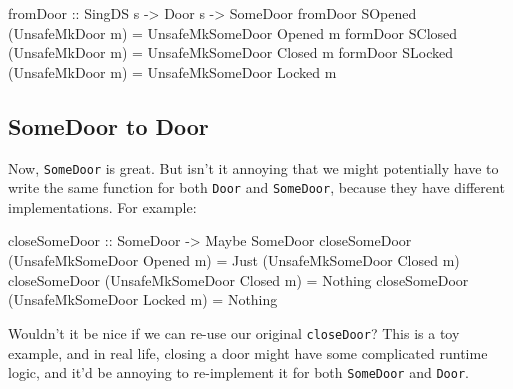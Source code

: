 \documentclass[]{article}
\newenvironment{Shaded}{}{}
\newcommand{\DataTypeTok}[1]{\textcolor[rgb]{0.56,0.13,0.00}{#1}}
\newcommand{\OtherTok}[1]{\textcolor[rgb]{0.00,0.44,0.13}{#1}}
\newcommand{\FunctionTok}[1]{\textcolor[rgb]{0.02,0.16,0.49}{#1}}
\newcommand{\NormalTok}[1]{#1}
\begin{document}
\begin{Shaded}
\begin{Highlighting}[]
\OtherTok{fromDoor ::} \DataTypeTok{SingDS}\NormalTok{ s }\OtherTok{->} \DataTypeTok{Door}\NormalTok{ s }\OtherTok{->} \DataTypeTok{SomeDoor}
\NormalTok{fromDoor }\DataTypeTok{SOpened}\NormalTok{ (}\DataTypeTok{UnsafeMkDoor}\NormalTok{ m) }\FunctionTok{=} \DataTypeTok{UnsafeMkSomeDoor} \DataTypeTok{Opened}\NormalTok{ m}
\NormalTok{formDoor }\DataTypeTok{SClosed}\NormalTok{ (}\DataTypeTok{UnsafeMkDoor}\NormalTok{ m) }\FunctionTok{=} \DataTypeTok{UnsafeMkSomeDoor} \DataTypeTok{Closed}\NormalTok{ m}
\NormalTok{formDoor }\DataTypeTok{SLocked}\NormalTok{ (}\DataTypeTok{UnsafeMkDoor}\NormalTok{ m) }\FunctionTok{=} \DataTypeTok{UnsafeMkSomeDoor} \DataTypeTok{Locked}\NormalTok{ m}
\end{Highlighting}
\end{Shaded}

\subsection{SomeDoor to Door}\label{somedoor-to-door}

Now, \texttt{SomeDoor} is great. But isn't it annoying that we might potentially
have to write the same function for both \texttt{Door} and \texttt{SomeDoor},
because they have different implementations. For example:

\begin{Shaded}
\begin{Highlighting}[]
\OtherTok{closeSomeDoor ::} \DataTypeTok{SomeDoor} \OtherTok{->} \DataTypeTok{Maybe} \DataTypeTok{SomeDoor}
\NormalTok{closeSomeDoor (}\DataTypeTok{UnsafeMkSomeDoor} \DataTypeTok{Opened}\NormalTok{ m) }\FunctionTok{=} \DataTypeTok{Just}\NormalTok{ (}\DataTypeTok{UnsafeMkSomeDoor} \DataTypeTok{Closed}\NormalTok{ m)}
\NormalTok{closeSomeDoor (}\DataTypeTok{UnsafeMkSomeDoor} \DataTypeTok{Closed}\NormalTok{ m) }\FunctionTok{=} \DataTypeTok{Nothing}
\NormalTok{closeSomeDoor (}\DataTypeTok{UnsafeMkSomeDoor} \DataTypeTok{Locked}\NormalTok{ m) }\FunctionTok{=} \DataTypeTok{Nothing}
\end{Highlighting}
\end{Shaded}

Wouldn't it be nice if we can re-use our original \texttt{closeDoor}? This is a
toy example, and in real life, closing a door might have some complicated
runtime logic, and it'd be annoying to re-implement it for both
\texttt{SomeDoor} and \texttt{Door}.
\end{document}
